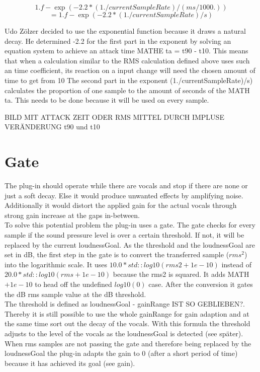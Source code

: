 $$1.f - \exp(-2.2*(1./currentSampleRate)/(ms/1000.))$$
$$=  1.f - \exp(-2.2*(1./currentSampleRate)/s)$$

Udo Zölzer decided to use the exponential function because it draws a natural decay. He determined -2.2 for the first part in the exponent by solving an equation system to achieve an attack time MATHE ta = t90 - t10. This means that when a calculation similar to the RMS calculation defined above uses such an time coefficient, its reaction on a input change will need the chosen amount of time to get from 10%
The second part in the exponent (1./currentSampleRate)/s) calculates the proportion of one sample to the amount of seconds of the MATH ta. This needs to be done because it will be used on every sample.

BILD MIT ATTACK ZEIT ODER RMS MITTEL DURCH IMPLUSE VERÄNDERUNG t90 und t10\\

\section{Gate}

The plug-in should operate while there are vocals and stop if there are none or just a soft decay. Else it would produce unwanted effects by amplifying noise. Additionally it would distort the applied gain for the actual vocals through strong gain increase at the gaps in-between.\\
To solve this potential problem the plug-in uses a gate. The gate checks for every sample if the sound pressure level is over a certain threshold. If not, it will be replaced by the current loudnessGoal. As the threshold and the loudnessGoal are set in dB, the first step in the gate is to convert the transferred sample ($rms^2$)  into the logarithmic scale. It uses $10.0 * std::log10(rms2 + 1e-10)$ instead of $20.0 * std::log10(rms + 1e-10)$ because the rms2 is squared. It adds MATH $+ 1e-10$ to head off the undefined $log10(0)$ case. After the conversion it gates the dB rms sample value at the dB threshold.\\
The threshold is defined as loudnessGoal - gainRange IST SO GEBLIEBEN?. Thereby it is still possible to use the whole gainRange for gain adaption and at the same time sort out the decay of the vocals. With this formula the threshold adjusts to the level of the vocals as the loudnessGoal is detected (see später).\\
When rms samples are not passing the gate and therefore being replaced by the loudnessGoal the plug-in adapts the gain to 0 (after a short period of time) because it has achieved its goal (see gain).\\

